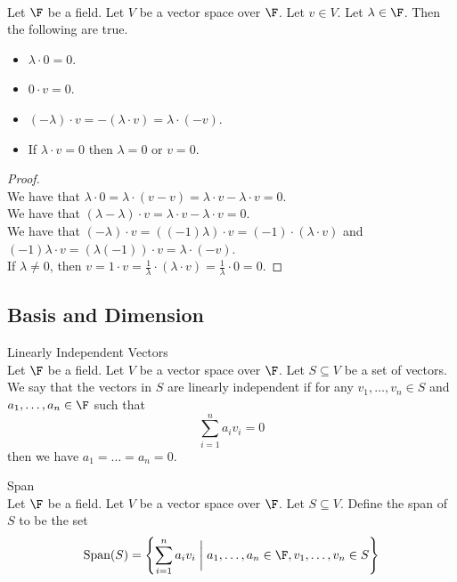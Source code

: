 \documentclass[a4paper]{article}
\begin{document}
\begin{lmm}{}{}\\
Let $\F$ be a field. Let $V$ be a vector space over $\F$. Let $v\in V$. Let $\lambda\in\F$. Then the following are true. 
\begin{itemize}
\item $\lambda\cdot 0=0$. 
\item $0\cdot v=0$. 
\item $(-\lambda)\cdot v=-(\lambda\cdot v)=\lambda\cdot(-v)$. 
\item If $\lambda\cdot v=0$ then $\lambda=0$ or $v=0$. 
\end{itemize}
\begin{proof}\\
We have that $\lambda\cdot 0=\lambda\cdot(v-v)=\lambda\cdot v-\lambda\cdot v=0$. \\

We have that $(\lambda-\lambda)\cdot v=\lambda\cdot v-\lambda\cdot v=0$. \\

We have that $(-\lambda)\cdot v=((-1)\lambda)\cdot v=(-1)\cdot(\lambda\cdot v)$ and $(-1)\lambda\cdot v=(\lambda(-1))\cdot v=\lambda\cdot(-v)$. \\

If $\lambda\neq 0$, then $v=1\cdot v=\frac{1}{\lambda}\cdot(\lambda\cdot v)=\frac{1}{\lambda}\cdot 0=0$. 
\end{proof}
\end{lmm}

\subsection{Basis and Dimension}
\begin{defn}{Linearly Independent Vectors}{}\\
Let $\F$ be a field. Let $V$ be a vector space over $\F$. Let $S\subseteq V$ be a set of vectors. We say that the vectors in $S$ are linearly independent if for any $v_1,\dots,v_n\in S$ and $a_1,\dots,a_n\in\F$ such that $$\sum_{i=1}^na_iv_i=0$$ then we have $a_1=\dots=a_n=0$. 
\end{defn}

\begin{defn}{Span}{}\\
Let $\F$ be a field. Let $V$ be a vector space over $\F$. Let $S\subseteq V$. Define the span of $S$ to be the set $$\text{Span}(S)=\left\{\sum_{i=1}^na_iv_i\;\bigg{|}\;a_1,\dots,a_n\in\F, v_1,\dots,v_n\in S\right\}$$
\end{defn}
\end{document}
